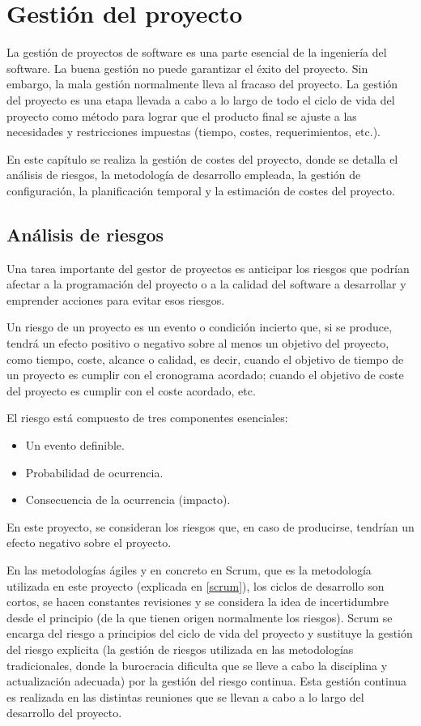 \chapter{Gestión del proyecto} \label{chgestion}
La gestión de proyectos de software es una parte esencial de la ingeniería del software. La buena gestión no puede garantizar el éxito del proyecto. Sin embargo, la mala gestión normalmente lleva al fracaso del proyecto. La gestión del proyecto es una etapa llevada a cabo a lo largo de todo el ciclo de vida del proyecto como método para lograr que el producto final se ajuste a las necesidades y restricciones impuestas (tiempo, costes, requerimientos, etc.).

En este capítulo se realiza la gestión de costes del proyecto, donde se detalla el análisis de riesgos, la metodología de desarrollo empleada,  la gestión de configuración, la planificación temporal y la estimación de costes del proyecto.

\section{Análisis de riesgos} \label{riesgos}
Una tarea importante del gestor de proyectos es anticipar los riesgos que podrían afectar a la programación del proyecto o a la calidad del software a desarrollar y emprender acciones para evitar esos riesgos.

Un riesgo de un proyecto es un evento o condición incierto que, si se produce, tendrá un efecto positivo o negativo sobre al menos un objetivo del proyecto, como tiempo, coste, alcance o calidad, es decir, cuando el objetivo de tiempo de un proyecto es cumplir con el cronograma acordado; cuando el objetivo de coste del proyecto es cumplir con el coste acordado, etc. 

El riesgo está compuesto de tres componentes esenciales:
\begin{itemize}
\item Un evento definible.
\item Probabilidad de ocurrencia.
\item Consecuencia de la ocurrencia (impacto).
\end{itemize}

En este proyecto, se consideran los riesgos que, en caso de producirse, tendrían un efecto negativo sobre el proyecto.

En las metodologías ágiles y en concreto en Scrum, que es la metodología utilizada en este proyecto (explicada en \ref{scrum}), los ciclos de desarrollo son cortos, se hacen constantes revisiones y se considera la idea de incertidumbre desde el principio (de la que tienen origen normalmente los riesgos). Scrum se encarga del riesgo a principios del ciclo de vida del proyecto y sustituye la gestión del riesgo explicita (la gestión de riesgos utilizada en las metodologías tradicionales, donde la burocracia dificulta que se lleve a cabo la disciplina y actualización adecuada) por la gestión del riesgo continua. Esta gestión continua es realizada en las distintas reuniones que se llevan a cabo a lo largo del desarrollo del proyecto.

